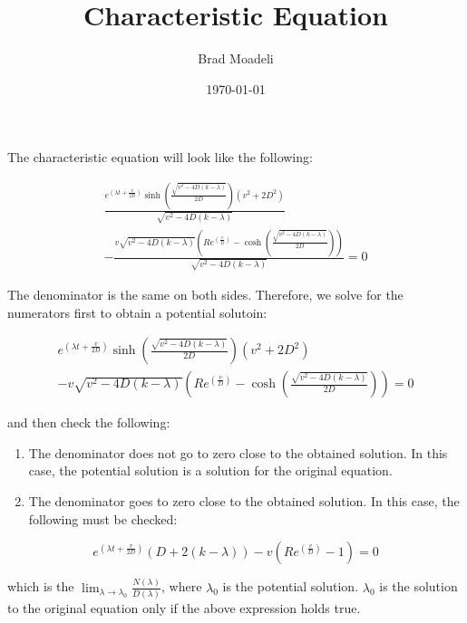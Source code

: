 \documentclass{article}
\title{Characteristic Equation}
\author{Brad Moadeli}
\date{\today} %
\begin{document}
\maketitle %

The characteristic equation will look like the following:

\begin{multline}
    \frac{e^{(\lambda t+\frac{v}{2D})}\sinh{(\frac{\sqrt{v^2-4D\left(k-\lambda\right)}}{2D})}(v^2+2D^2)}{\sqrt{v^2-4D\left(k-\lambda\right)}}\\
    - \frac{v\sqrt{v^2-4D\left(k-\lambda\right)}\left(Re^{(\frac{v}{D})}-\cosh{(\frac{\sqrt{v^2-4D\left(k-\lambda\right)}}{2D})}\right)}{\sqrt{v^2-4D\left(k-\lambda\right)}} = 0
\end{multline}

The denominator is the same on both sides. Therefore, we solve for the numerators first to obtain a potential solutoin:

\begin{multline}
    e^{(\lambda t+\frac{v}{2D})}\sinh{(\frac{\sqrt{v^2-4D\left(k-\lambda\right)}}{2D})}(v^2+2D^2)\\
    - v\sqrt{v^2-4D\left(k-\lambda\right)}\left(Re^{(\frac{v}{D})}-\cosh{(\frac{\sqrt{v^2-4D\left(k-\lambda\right)}}{2D})}\right) = 0
\end{multline}

and then check the following:

\begin{enumerate}
    \item The denominator does not go to zero close to the obtained solution. In this case, the potential solution is a solution for the original equation.
    \item The denominator goes to zero close to the obtained solution. In this case, the following must be checked:
\end{enumerate}

\begin{equation}
    e^{(\lambda t+\frac{v}{2D})}\left(D+2\left(k-\lambda\right)\right) - v\left(Re^{(\frac{v}{D})}-1\right) = 0
\end{equation}

which is the $\lim_{\lambda \rightarrow \lambda_0}\frac{N(\lambda)}{D(\lambda)}$, where $\lambda_0$ is the potential solution. $\lambda_0$ is the solution to the original equation only if the above expression holds true.
\end{document}
